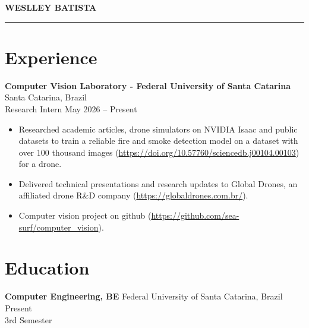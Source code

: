 \documentclass[a4paper,10pt]{article}
\begin{document}
\pagestyle{empty} %

\begin{center}
    {\huge \textbf{WESLLEY BATISTA}} \\ %
    \vspace{4pt}
    \hrule
    \vspace{6pt}
    {\small
    }
\end{center}

\section*{Experience}
\noindent
\textbf{Computer Vision Laboratory - Federal University of Santa Catarina} \hfill Santa Catarina, Brazil \\
Research Intern \hfill May 2026 -- Present
\begin{itemize}[leftmargin=*, noitemsep, topsep=0pt]
    \item Researched academic articles, drone simulators on NVIDIA Isaac and public datasets to train a reliable fire and smoke detection model on a dataset with over 100 thousand images (\url{https://doi.org/10.57760/sciencedb.j00104.00103}) for a drone.
    \item Delivered technical presentations and research updates to Global Drones, an affiliated drone R\&D company (\url{https://globaldrones.com.br/}).
    \item Computer vision project on github (\url{https://github.com/sea-surf/computer_vision}).
\end{itemize}


\section*{Education}
\noindent
\textbf{Computer Engineering, BE} \hfill Federal University of Santa Catarina, Brazil \hfill Present\\ \hfill 3rd Semester


\end{document}
